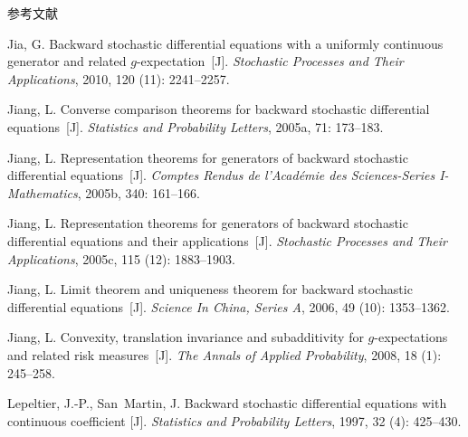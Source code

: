 \documentclass[xcolor=svgnames,serif,table,10pt]{beamer}
\begin{document}
\begin{frame}[allowframebreaks]{参考文献}
\begin{thebibliography}{57}

Jia, G.
\newblock Backward stochastic differential equations with a uniformly
  continuous generator and related $g$-expectation~[J].
\newblock \emph{Stochastic Processes and Their Applications}, 2010,
  120 (11): 2241--2257.

Jiang, L.
\newblock Converse comparison theorems for backward stochastic differential
  equations~[J].
\newblock \emph{Statistics and Probability Letters}, 2005a, 71:
  173--183.

Jiang, L.
\newblock Representation theorems for generators of backward stochastic
  differential equations~[J].
\newblock \emph{Comptes Rendus de l'Acad{\'e}mie des Sciences-Series
  I-Mathematics}, 2005b, 340: 161--166.

Jiang, L.
\newblock Representation theorems for generators of backward stochastic
  differential equations and their applications~[J].
\newblock \emph{Stochastic Processes and Their Applications}, 2005c,
  115 (12): 1883--1903.

Jiang, L.
\newblock Limit theorem and uniqueness theorem for backward stochastic
  differential equations~[J].
\newblock \emph{Science In China, Series A}, 2006, 49 (10):
  1353--1362.

Jiang, L.
\newblock Convexity, translation invariance and subadditivity for
  $g$-expectations and related risk measures~[J].
\newblock \emph{The Annals of Applied Probability}, 2008, 18
  (1): 245--258.


Lepeltier, J.-P., San~Martin, J.
\newblock Backward stochastic differential equations with continuous
  coefficient [J].
\newblock \emph{Statistics and Probability Letters}, 1997, 32
  (4): 425--430.


\end{thebibliography}
\end{frame}
\end{document}
